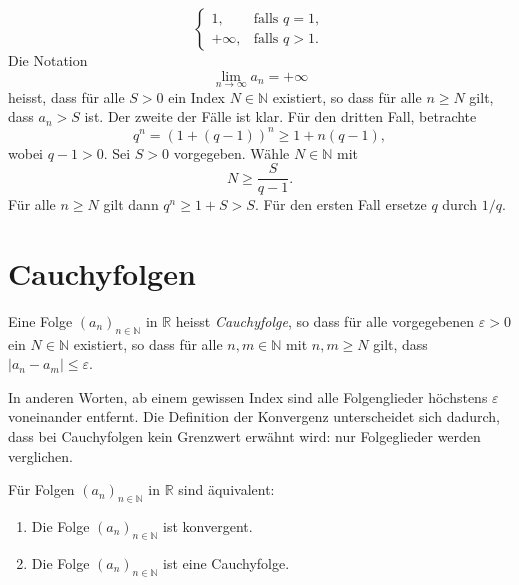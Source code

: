 \documentclass[../main.tex]{subfiles}
\begin{document}
\begin{examples}
\begin{enumerate}[(1)]
\[\begin{cases}
		    1, & \text{falls } q = 1, \\
		    +\infty, & \text{falls } q > 1.
	    \end{cases}
	  \]
	Die Notation
	\[
	  \lim_{n \to \infty} a_n = + \infty
	\]
	heisst, dass für alle $S > 0$ ein Index $N \in \mathbb{N}$
	existiert, so dass für alle $n \geq N$ gilt, dass
	$a_n > S$ ist.
	Der zweite der Fälle ist klar. Für den dritten Fall, 
	betrachte
	\[
		q^n = {\left( 1 + (q-1) \right)}^n \geq 1 + n(q-1),
	\]
	wobei $q-1 > 0$. 
	Sei $S > 0$ vorgegeben. Wähle $N \in \mathbb{N}$ mit
	\[
	  N \geq \frac{S}{q-1}.
	\]
	Für alle $n \geq N$ gilt dann $q^n \geq 1 + S > S$.
	Für den ersten Fall ersetze $q$ durch $1/q$.
\end{enumerate}
\end{examples}

\section{Cauchyfolgen}
\begin{definition}
Eine Folge 
${\left( a_n \right)}_{n \in \mathbb{N}}$ in $\mathbb{R}$ 
heisst \emph{Cauchyfolge}, so dass für alle
vorgegebenen $\varepsilon > 0$ ein $N \in \mathbb{N}$ existiert,
so dass für alle $n, m \in \mathbb{N}$ mit $n,m \geq N$ gilt,
dass $|a_n - a_m| \leq \varepsilon$.
\end{definition}

In anderen Worten, ab einem gewissen Index sind alle
Folgenglieder höchstens $\varepsilon$ voneinander 
entfernt. Die Definition der Konvergenz unterscheidet
sich dadurch, dass bei Cauchyfolgen kein Grenzwert
erwähnt wird: nur Folgeglieder werden verglichen.

\begin{theorem}
Für Folgen ${\left( a_n \right)}_{n \in \mathbb{N}}$ in $\mathbb{R}$
  sind äquivalent:
  \begin{enumerate}[\normalfont(i)]
    \item Die Folge ${\left( a_n \right)}_{n \in \mathbb{N}}$
      ist konvergent.
    \item Die Folge ${\left( a_n \right)}_{n \in \mathbb{N}}$
      ist eine Cauchyfolge.
  \end{enumerate}
\end{theorem}
\end{document}
